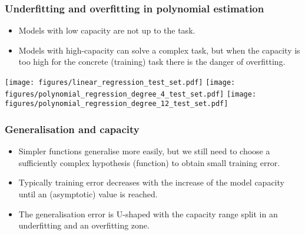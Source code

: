\documentclass[notes]{beamer}          %
\newif\iffull
\begin{document}
\iffull
\begin{frame}
\frametitle{Model capacity}
    \begin{itemize}
        \item A {\bf capacity of the model} is its ability to fit a wide variety of functions.

        \item Low capacity models struggle to fit the training set (underfitting).
        \item Models with high capacity have danger to overfit the training data (e.g., by ``memorising'' training samples).
	\pause
        \item The capacity can be controlled by choosing its {\bf hypothesis space}, i.e. the set of functions from which the learning algorithm is allowed to select the solution.
        \item Example: The linear regression algorithm has the set of all linear functions as its hypothesis space.

    \end{itemize}
\end{frame}
\fi

\begin{frame}
\frametitle{Underfitting and overfitting in polynomial estimation}
    \begin{itemize}
        \item Models with low capacity are not up to the task.
        \item Models with high-capacity can solve a complex task, but when the capacity is too high for the concrete (training) task there is the danger of overfitting.
    \end{itemize}
    \vfill
    \begin{center}
        \texttt{[image: figures/linear\_regression\_test\_set.pdf]}
        \texttt{[image: figures/polynomial\_regression\_degree\_4\_test\_set.pdf]}
        \texttt{[image: figures/polynomial\_regression\_degree\_12\_test\_set.pdf]}
    \end{center}
\end{frame}

\begin{frame}
\frametitle{Generalisation and capacity}
    \begin{itemize}
        \item Simpler functions generalise more easily, but we still need to choose a sufficiently complex hypothesis (function) to obtain small training error.
        \item Typically training error decreases with the increase of the model capacity until an (asymptotic) value is reached.
        \item The generalisation error is U-shaped with the capacity range split in an underfitting and an overfitting zone. 
    \end{itemize}
\end{frame}
\end{document}

